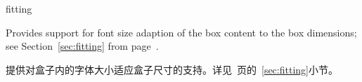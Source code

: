 











\begin{docTcbKey}[library]{fitting}{}{}

Provides support for font size adaption of the box content to
the box dimensions;
see Section~\ref{sec:fitting} from page~\pageref{sec:fitting}.

提供对盒子内的字体大小适应盒子尺寸的支持。详见~\pageref{sec:fitting}页的~\ref{sec:fitting}小节。

\end{docTcbKey}
















